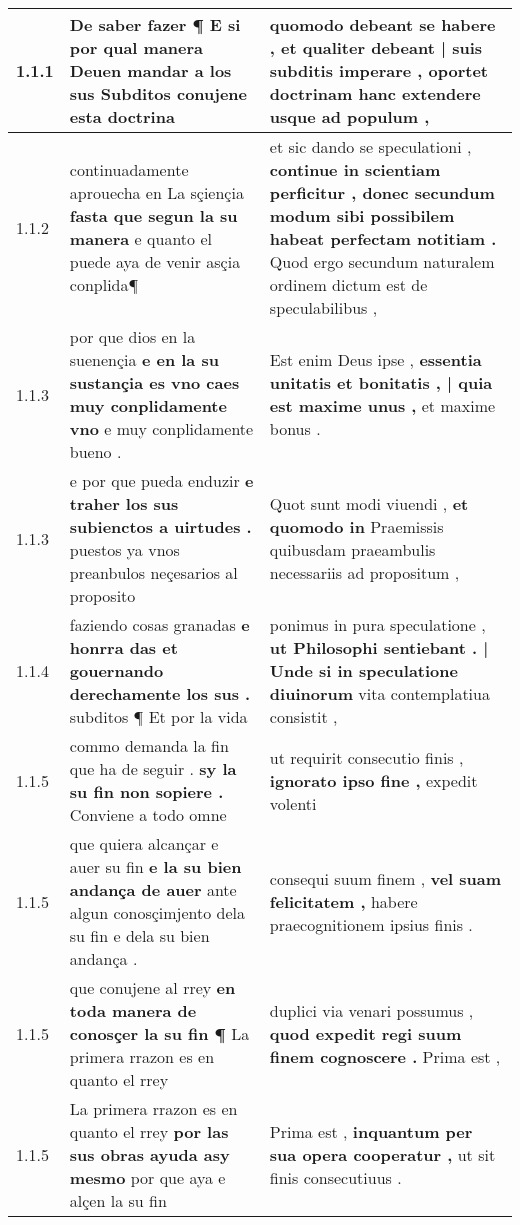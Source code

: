 \begin{tabular}{|p{1cm}|p{6.5cm}|p{6.5cm}|}

\hline
1.1.1 & De saber fazer ¶ \textbf{ E si por qual manera Deuen mandar a los sus Subditos } conujene esta doctrina & quomodo debeant se habere , \textbf{ et qualiter debeant | suis subditis imperare , } oportet doctrinam hanc extendere usque ad populum , \\\hline
1.1.2 & continuadamente aprouecha en La sçiençia \textbf{ fasta que segun la su manera } e quanto el puede aya de venir asçia conplida¶ & et sic dando se speculationi , \textbf{ continue in scientiam perficitur , donec secundum modum sibi possibilem habeat perfectam notitiam . } Quod ergo secundum naturalem ordinem dictum est de speculabilibus , \\\hline
1.1.3 & por que dios en la suenençia \textbf{ e en la su sustançia es vno caes muy conplidamente vno } e muy conplidamente bueno . & Est enim Deus ipse , \textbf{ essentia unitatis et bonitatis , | quia est maxime unus , } et maxime bonus . \\\hline
1.1.3 & e por que pueda enduzir \textbf{ e traher los sus subienctos a uirtudes . } puestos ya vnos preanbulos neçesarios al proposito & Quot sunt modi viuendi , \textbf{ et quomodo in } Praemissis quibusdam praeambulis necessariis ad propositum , \\\hline
1.1.4 & faziendo cosas granadas \textbf{ e honrra das et gouernando derechamente los sus . } subditos ¶ Et por la vida & ponimus in pura speculatione , \textbf{ ut Philosophi sentiebant . | Unde si in speculatione diuinorum } vita contemplatiua consistit , \\\hline
1.1.5 & commo demanda la fin que ha de seguir . \textbf{ sy la su fin non sopiere . } Conviene a todo omne & ut requirit consecutio finis , \textbf{ ignorato ipso fine , } expedit volenti \\\hline
1.1.5 & que quiera alcançar e auer su fin \textbf{ e la su bien andança de auer } ante algun conosçimjento dela su fin e dela su bien andança . & consequi suum finem , \textbf{ vel suam felicitatem , } habere praecognitionem ipsius finis . \\\hline
1.1.5 & que conujene al rrey \textbf{ en toda manera de conosçer la su fin ¶ } La primera rrazon es en quanto el rrey & duplici via venari possumus , \textbf{ quod expedit regi suum finem cognoscere . } Prima est , \\\hline
1.1.5 & La primera rrazon es en quanto el rrey \textbf{ por las sus obras ayuda asy mesmo } por que aya e alçen la su fin & Prima est , \textbf{ inquantum per sua opera cooperatur , } ut sit finis consecutiuus . \\\hline

\end{tabular}
